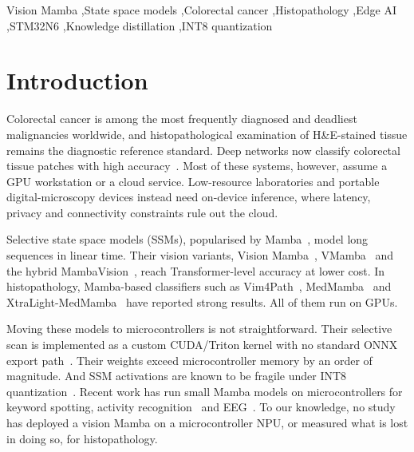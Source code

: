 \documentclass[preprint,12pt]{elsarticle}
\begin{document}
\begin{frontmatter}
\begin{keyword}
Vision Mamba \sep State space models \sep Colorectal cancer \sep Histopathology \sep Edge AI \sep STM32N6 \sep Knowledge distillation \sep INT8 quantization
\end{keyword}
\end{frontmatter}

\section{Introduction}
Colorectal cancer is among the most frequently diagnosed and deadliest malignancies worldwide, and histopathological examination of H\&E-stained tissue remains the diagnostic reference standard. Deep networks now classify colorectal tissue patches with high accuracy~\cite{kather2019}. Most of these systems, however, assume a GPU workstation or a cloud service. Low-resource laboratories and portable digital-microscopy devices instead need on-device inference, where latency, privacy and connectivity constraints rule out the cloud.

Selective state space models (SSMs), popularised by Mamba~\cite{gu2023mamba}, model long sequences in linear time. Their vision variants, Vision Mamba~\cite{zhu2024vim}, VMamba~\cite{liu2024vmamba} and the hybrid MambaVision~\cite{hatamizadeh2025mambavision}, reach Transformer-level accuracy at lower cost. In histopathology, Mamba-based classifiers such as Vim4Path~\cite{nasirisarvi2024vim4path}, MedMamba~\cite{yue2024medmamba} and XtraLight-MedMamba~\cite{sultana2026xtralight} have reported strong results. All of them run on GPUs.

Moving these models to microcontrollers is not straightforward. Their selective scan is implemented as a custom CUDA/Triton kernel with no standard ONNX export path~\cite{xu2025mambalite}. Their weights exceed microcontroller memory by an order of magnitude. And SSM activations are known to be fragile under INT8 quantization~\cite{chiang2025quamba}. Recent work has run small Mamba models on microcontrollers for keyword spotting, activity recognition~\cite{xu2025mambalite} and EEG~\cite{tegon2026femba}. To our knowledge, no study has deployed a vision Mamba on a microcontroller NPU, or measured what is lost in doing so, for histopathology.
\end{document}
